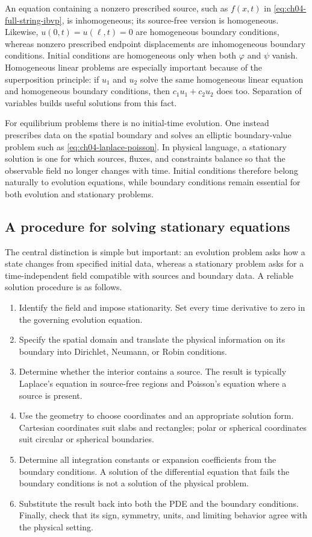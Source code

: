 An equation containing a nonzero prescribed source, such as $f(x,t)$ in \eqref{eq:ch04-full-string-ibvp}, is inhomogeneous; its source-free version is homogeneous. Likewise, $u(0,t)=u(\ell,t)=0$ are homogeneous boundary conditions, whereas nonzero prescribed endpoint displacements are inhomogeneous boundary conditions. Initial conditions are homogeneous only when both $\varphi$ and $\psi$ vanish. Homogeneous linear problems are especially important because of the superposition principle: if $u_1$ and $u_2$ solve the same homogeneous linear equation and homogeneous boundary conditions, then $c_1u_1+c_2u_2$ does too. Separation of variables builds useful solutions from this fact.

For equilibrium problems there is no initial-time evolution. One instead prescribes data on the spatial boundary and solves an elliptic boundary-value problem such as \eqref{eq:ch04-laplace-poisson}. In physical language, a stationary solution is one for which sources, fluxes, and constraints balance so that the observable field no longer changes with time. Initial conditions therefore belong naturally to evolution equations, while boundary conditions remain essential for both evolution and stationary problems.

\subsection{A procedure for solving stationary equations}

The central distinction is simple but important: an evolution problem asks how a state changes from specified initial data, whereas a stationary problem asks for a time-independent field compatible with sources and boundary data. A reliable solution procedure is as follows.
\begin{enumerate}
\item Identify the field and impose stationarity. Set every time derivative to zero in the governing evolution equation.
\item Specify the spatial domain and translate the physical information on its boundary into Dirichlet, Neumann, or Robin conditions.
\item Determine whether the interior contains a source. The result is typically Laplace's equation in source-free regions and Poisson's equation where a source is present.
\item Use the geometry to choose coordinates and an appropriate solution form. Cartesian coordinates suit slabs and rectangles; polar or spherical coordinates suit circular or spherical boundaries.
\item Determine all integration constants or expansion coefficients from the boundary conditions. A solution of the differential equation that fails the boundary conditions is not a solution of the physical problem.
\item Substitute the result back into both the PDE and the boundary conditions. Finally, check that its sign, symmetry, units, and limiting behavior agree with the physical setting.
\end{enumerate}

